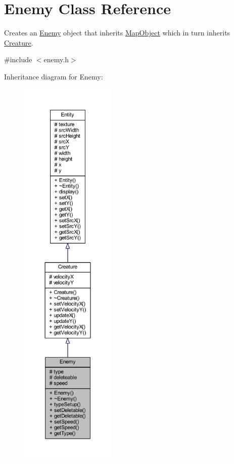 \hypertarget{class_enemy}{\section{Enemy Class Reference}
\label{class_enemy}
}


Creates an \hyperlink{class_enemy}{Enemy} object that inherits \hyperlink{class_map_object}{Map\+Object} which in turn inherits \hyperlink{class_creature}{Creature}.  




{\ttfamily \#include $<$enemy.\+h$>$}



Inheritance diagram for Enemy\+:
\nopagebreak
\begin{figure}[H]
\begin{center}
\leavevmode
\includegraphics[height=550pt]{class_enemy__inherit__graph}
\end{center}
\end{figure}


